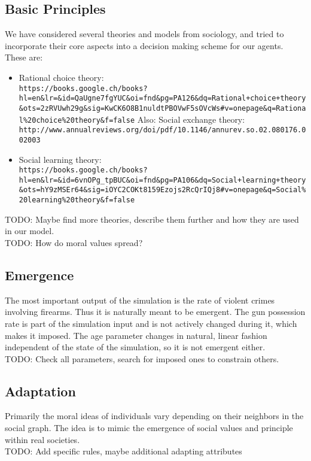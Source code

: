 \documentclass{article}
\begin{document}
		\subsection{Basic Principles}
			We have considered several theories and models from sociology, and tried to incorporate
			their core aspects into a decision making scheme for our agents. These are:
			\begin{itemize}
				\item Rational choice theory:\\
					\verb|https://books.google.ch/books?hl=en&lr=&id=QaUgne7fgYUC&oi=fnd&pg=PA126&dq=Rational+choice+theory&ots=2zRVUwh29g&sig=KwCK6O8B1nuldtPBOVwF5sOVcWs#v=onepage&q=Rational%20choice%20theory&f=false|
					Also: Social exchange theory:\\
					\verb|http://www.annualreviews.org/doi/pdf/10.1146/annurev.so.02.080176.002003|

				\item Social learning theory:\\
					\verb|https://books.google.ch/books?hl=en&lr=&id=6vnOPg_tpBUC&oi=fnd&pg=PA106&dq=Social+learning+theory&ots=hY9zMSEr64&sig=iOYC2COKt8159Ezojs2RcQrIQj8#v=onepage&q=Social%20learning%20theory&f=false|
			\end{itemize}
			TODO: Maybe find more theories, describe them further and how they are used in our model.\\
			TODO: How do moral values spread?

		\subsection{Emergence}
			The most important output of the simulation is the rate of violent crimes involving
			firearms. Thus it is naturally meant to be emergent. The gun possession rate is part
			of the simulation input and is not actively changed during it, which makes it imposed.
			The age parameter changes in natural, linear fashion independent of the state of the
			simulation, so it is not emergent either.\\
			TODO: Check all parameters, search for imposed ones to constrain others.

		\subsection{Adaptation}
			Primarily the moral ideas of individuals vary depending on their neighbors in the social
			graph. The idea is to mimic the emergence of social values and principle within real
			societies.\\
			TODO: Add specific rules, maybe additional adapting attributes
\end{document}

